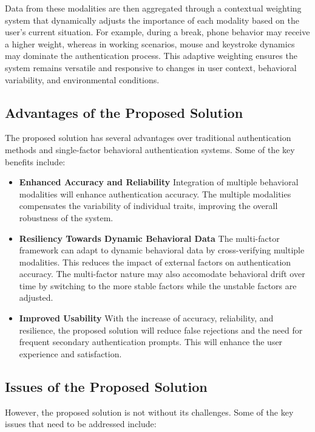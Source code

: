 Data from these modalities are then aggregated through a contextual weighting system that dynamically adjusts the importance of each modality based on the user's current situation. For example, during a break, phone behavior may receive a higher weight, whereas in working scenarios, mouse and keystroke dynamics may dominate the authentication process. This adaptive weighting ensures the system remains versatile and responsive to changes in user context, behavioral variability, and environmental conditions.

\subsection{Advantages of the Proposed Solution}

The proposed solution has several advantages over traditional authentication methods and single-factor behavioral authentication systems. Some of the key benefits include:

\begin{itemize}
    \item \textbf{Enhanced Accuracy and Reliability}
    Integration of multiple behavioral modalities will enhance authentication accuracy. The multiple modalities compensates the variability of individual traits, improving the overall robustness of the system.

    \item \textbf{Resiliency Towards Dynamic Behavioral Data}
    The multi-factor framework can adapt to dynamic behavioral data by cross-verifying multiple modalities. This reduces the impact of external factors on authentication accuracy. The multi-factor nature may also accomodate behavioral drift over time by switching to the more stable factors while the unstable factors are adjusted.
    
    \item \textbf{Improved Usability}
    With the increase of accuracy, reliability, and resilience, the proposed solution will reduce false rejections and the need for frequent secondary authentication prompts. This will enhance the user experience and satisfaction.

\end{itemize}

\subsection{Issues of the Proposed Solution}

However, the proposed solution is not without its challenges. Some of the key issues that need to be addressed include:

